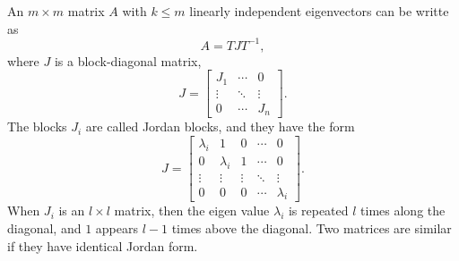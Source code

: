 \begin{fact}
An $m \times m$ matrix $A$ with $k \leq m$ linearly independent eigenvectors can be writte as
\begin{equation*}
A = T J T^{-1} ,
\end{equation*}
where $J$ is a block-diagonal matrix,
\begin{equation*}
J = \left[ \begin{array}{ccc}
J_1 & \cdots & 0 \\
\vdots & \ddots & \vdots \\
0 & \cdots & J_n
\end{array} \right] .
\end{equation*}
The blocks $J_i$ are called Jordan blocks, and they have the form
\begin{equation*}
J = \left[ \begin{array}{ccccc}
\lambda_i & 1 & 0 &\cdots & 0 \\
0 & \lambda_i & 1 & \cdots & 0 \\
\vdots & \vdots & \vdots & \ddots & \vdots \\
0 & 0 & 0 & \cdots & \lambda_i
\end{array} \right] .
\end{equation*}
When $J_i$ is an $l \times l$ matrix, then the eigen value $\lambda_i$ is repeated $l$ times along the diagonal, and $1$ appears $l - 1$ times above the diagonal.
Two matrices are similar if they have identical Jordan form.
\end{fact}



